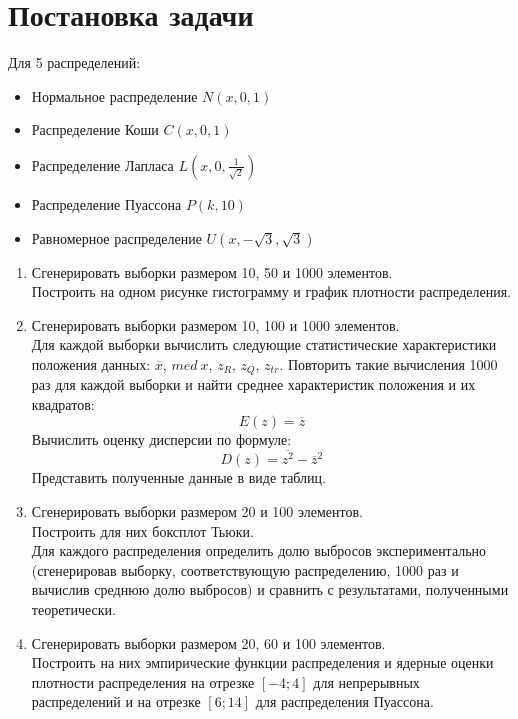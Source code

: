 \section{Постановка задачи}

Для 5 распределений:

\begin{itemize}
	\item Нормальное распределение $N(x,0,1)$
	\item Распределение Коши $C(x,0,1)$	
	\item Распределение Лапласа $L(x,0,\frac{1}{\sqrt{2}})$	
	\item Распределение Пуассона $P(k,10)$	
	\item Равномерное распределение $U(x,-\sqrt{3},\sqrt{3})$
\end{itemize}

\begin{enumerate}
	\item Сгенерировать выборки размером 10, 50 и 1000 элементов. \\
	Построить на одном рисунке гистограмму и график плотности распределения.
	
	\item Сгенерировать выборки размером 10, 100 и 1000 элементов. \\
	Для каждой выборки вычислить следующие статистические характеристики положения данных: $\overline{x}$, $med \ x$, $z_{R}$, $z_{Q}$, $z_{tr}$. Повторить такие вычисления 1000 раз для каждой выборки и найти среднее характеристик положения и их квадратов:
	\begin{equation}
		E(z)=\overline{z}
	\end{equation}
	Вычислить оценку дисперсии по формуле: 
	\begin{equation}
		D(z)=\overline{z^{2}}-\overline{z}^{2}
	\end{equation}
	Представить полученные данные в виде таблиц.
	
	\item Сгенерировать выборки размером 20 и 100 элементов. \\
	Построить для них боксплот Тьюки. \\
	Для каждого распределения определить долю выбросов экспериментально (сгенерировав выборку, соответствующую распределению, 1000 раз и вычислив среднюю долю выбросов) и сравнить с результатами, полученными теоретически.
	
	\item Сгенерировать выборки размером 20, 60 и 100 элементов. \\
	Построить на них эмпирические функции распределения и ядерные оценки плотности распределения на отрезке $[-4;4]$ для непрерывных распределений и на отрезке $[6;14]$ для распределения Пуассона.
\end{enumerate}

\newpage
